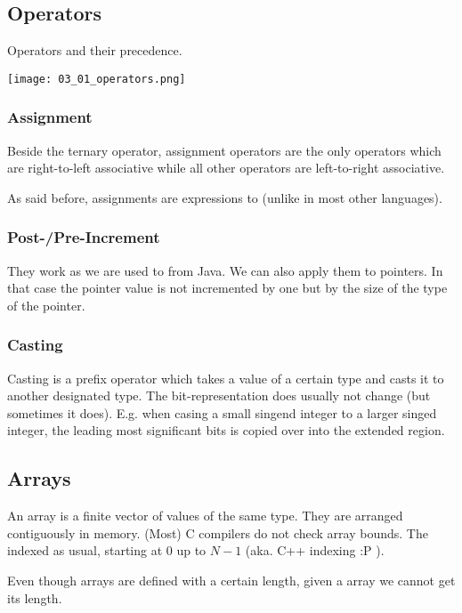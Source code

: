 

\subsection*{Operators}
Operators and their precedence.

\texttt{[image: 03\_01\_operators.png]}

\subsubsection{Assignment}
Beside the ternary operator, assignment operators are the only operators which are right-to-left associative while all other operators are left-to-right associative.

As said before, assignments are expressions to (unlike in most other languages).

\subsubsection{Post-/Pre-Increment}
They work as we are used to from Java. We can also apply them to pointers. In that case the pointer value is not incremented by one but by the size of the type of the pointer.

\subsubsection{Casting}
Casting is a prefix operator  which takes a value of a certain type and casts it to another designated type. The bit-representation does usually not change (but sometimes it does). E.g. when casing a small singend integer to a larger singed integer, the leading most significant bits is copied over into the extended region.

\subsection*{Arrays}
An array is a finite vector of values of the same type. They are arranged contiguously in memory. (Most) C compilers do not check array bounds. The indexed as usual, starting at $0$ up to $N-1$ (aka. C++ indexing :P ).

Even though arrays are defined with a certain length, given a array we cannot get its length.


